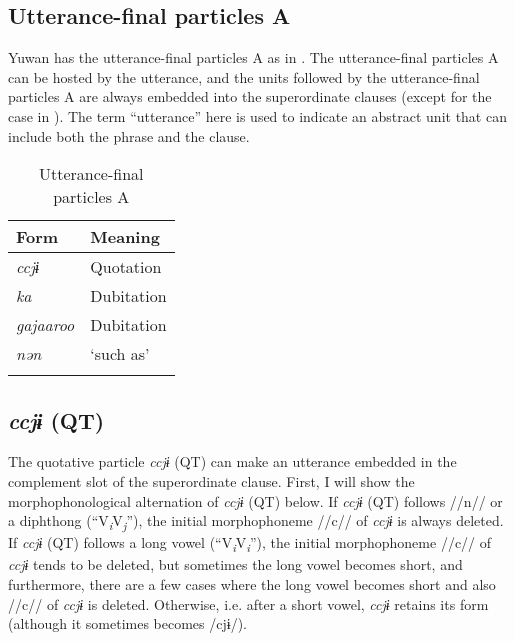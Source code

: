 \begin{xlist}
\section{Utterance-final particles A}\label{sec:10.4}

Yuwan has the utterance-final particles A as in . The utterance-final particles A can be hosted by the utterance, and the units followed by the utterance-final particles A are always embedded into the superordinate clauses (except for the case in ). The term “utterance” here is used to indicate an abstract unit that can include both the phrase and the clause.

\begin{table}
\caption{Utterance-final particles A\label{tab:100}}
\begin{tabular}{ll}
\lsptoprule
Form & Meaning\\\midrule
\textit{ccjɨ}     & Quotation \\
\textit{ka}       & Dubitation\\
\textit{gajaaroo} & Dubitation\\
\textit{nən}      & ‘such as’ \\
\lspbottomrule
\end{tabular}
\end{table}

\subsection{\textit{ccjɨ} (QT)}\label{sec:10.4.1}

The quotative particle \textit{ccjɨ} (QT) can make an utterance embedded in the complement slot of the superordinate clause. First, I will show the morphophonological alternation of \textit{ccjɨ} (QT) below. If \textit{ccjɨ} (QT) follows //n// or a diphthong (“V\textit{\textsubscript{i}}V\textit{\textsubscript{j}}”), the initial morphophoneme //c// of \textit{ccjɨ} is always deleted. If \textit{ccjɨ} (QT) follows a long vowel (“V\textit{\textsubscript{i}}V\textit{\textsubscript{i}}”), the initial morphophoneme //c// of \textit{ccjɨ} tends to be deleted, but sometimes the long vowel becomes short, and furthermore, there are a few cases where the long vowel becomes short and also //c// of \textit{ccjɨ} is deleted. Otherwise, i.e. after a short vowel, \textit{ccjɨ} retains its form (although it sometimes becomes /cjɨ/).


\end{xlist}
